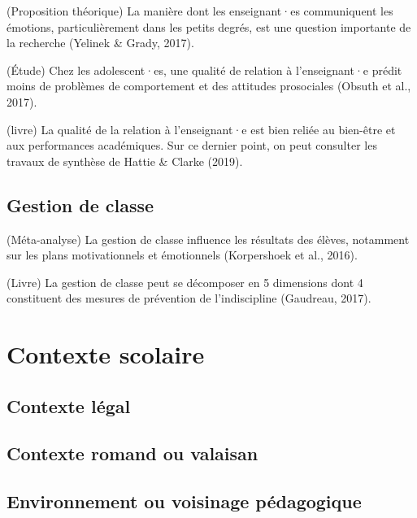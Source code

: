 \documentclass[
  french,
]{article}
\begin{document}
(Proposition théorique) La manière dont les enseignant·es communiquent les émotions, particulièrement dans les petits degrés, est une question importante de la recherche (Yelinek \& Grady, 2017).

(Étude) Chez les adolescent·es, une qualité de relation à l'enseignant·e prédit moins de problèmes de comportement et des attitudes prosociales (Obsuth et al., 2017).

(livre) La qualité de la relation à l'enseignant·e est bien reliée au bien-être et aux performances académiques. Sur ce dernier point, on peut consulter les travaux de synthèse de Hattie \& Clarke (2019).

\hypertarget{gestion-de-classe}{%
\subsection{Gestion de classe}\label{gestion-de-classe}}

(Méta-analyse) La gestion de classe influence les résultats des élèves, notamment sur les plans motivationnels et émotionnels (Korpershoek et al., 2016).

(Livre) La gestion de classe peut se décomposer en 5 dimensions dont 4 constituent des mesures de prévention de l'indiscipline (Gaudreau, 2017).

\hypertarget{contexte-scolaire}{%
\section{Contexte scolaire}\label{contexte-scolaire}}

\hypertarget{contexte-luxe9gal}{%
\subsection{Contexte légal}\label{contexte-luxe9gal}}

\hypertarget{contexte-romand-ou-valaisan}{%
\subsection{Contexte romand ou valaisan}\label{contexte-romand-ou-valaisan}}

\hypertarget{environnement-ou-voisinage-puxe9dagogique}{%
\subsection{Environnement ou voisinage pédagogique}\label{environnement-ou-voisinage-puxe9dagogique}}
\end{document}
